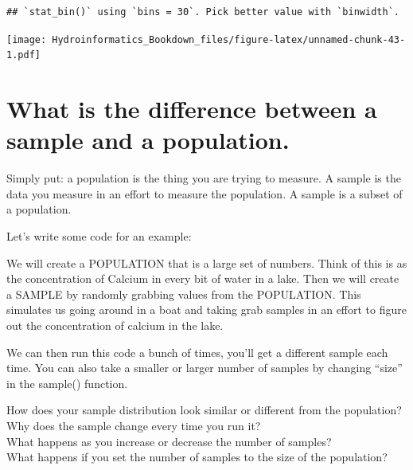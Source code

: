 \documentclass[
]{book}
\begin{document}
\begin{verbatim}
## `stat_bin()` using `bins = 30`. Pick better value with `binwidth`.
\end{verbatim}

\texttt{[image: Hydroinformatics\_Bookdown\_files/figure-latex/unnamed-chunk-43-1.pdf]}

\hypertarget{what-is-the-difference-between-a-sample-and-a-population.}{%
\section{What is the difference between a sample and a population.}\label{what-is-the-difference-between-a-sample-and-a-population.}}

Simply put: a population is the thing you are trying to measure. A sample is the data you measure in an effort to measure the population. A sample is a subset of a population.

Let's write some code for an example:

We will create a POPULATION that is a large set of numbers. Think of this is as the concentration of Calcium in every bit of water in a lake. Then we will create a SAMPLE by randomly grabbing values from the POPULATION. This simulates us going around in a boat and taking grab samples in an effort to figure out the concentration of calcium in the lake.

We can then run this code a bunch of times, you'll get a different sample each time. You can also take a smaller or larger number of samples by changing ``size'' in the sample() function.

How does your sample distribution look similar or different from the population?\\
Why does the sample change every time you run it?\\
What happens as you increase or decrease the number of samples?\\
What happens if you set the number of samples to the size of the population?
\end{document}
